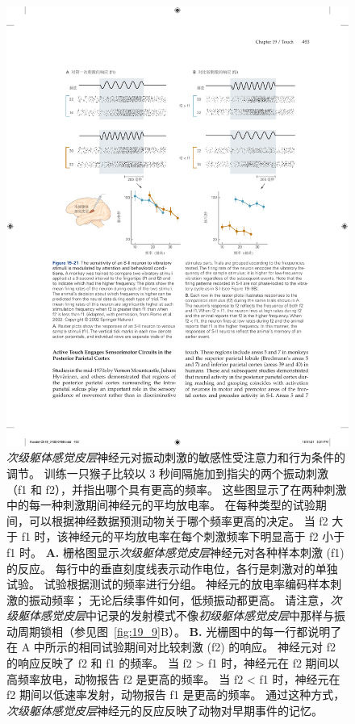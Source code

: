 \begin{figure}[htbp]
	\centering
	\includegraphics[width=1.0\linewidth]{chap19/fig_19_21}
	\caption{\textit{次级躯体感觉皮层}神经元对振动刺激的敏感性受注意力和行为条件的调节。
		训练一只猴子比较以 3 秒间隔施加到指尖的两个振动刺激（f1 和 f2），并指出哪个具有更高的频率。
		这些图显示了在两种刺激中的每一种刺激期间神经元的平均放电率。
		在每种类型的试验期间，可以根据神经数据预测动物关于哪个频率更高的决定。
		当 f2 大于 f1 时，该神经元的平均放电率在每个刺激频率下明显高于 f2 小于 f1 时\cite{romo2002neuronal}。
		\textbf{A.} 栅格图显示\textit{次级躯体感觉皮层}神经元对各种样本刺激 (f1) 的反应。
		每行中的垂直刻度线表示动作电位，各行是刺激对的单独试验。
		试验根据测试的频率进行分组。
		神经元的放电率编码样本刺激的振动频率； 无论后续事件如何，低频振动都更高。
		请注意，\textit{次级躯体感觉皮层}中记录的发射模式不像\textit{初级躯体感觉皮层}中那样与振动周期锁相（参见图~\ref{fig:19_9}B）。
		\textbf{B.} 光栅图中的每一行都说明了在 A 中所示的相同试验期间对比较刺激 (f2) 的响应。
		神经元对 f2 的响应反映了 f2 和 f1 的频率。
		当 f2 > f1 时，神经元在 f2 期间以高频率放电，动物报告 f2 是更高的频率。
		当 f2 < f1 时，神经元在 f2 期间以低速率发射，动物报告 f1 是更高的频率。
		通过这种方式，\textit{次级躯体感觉皮层}神经元的反应反映了动物对早期事件的记忆。}
	\label{fig:19_21}
\end{figure}


